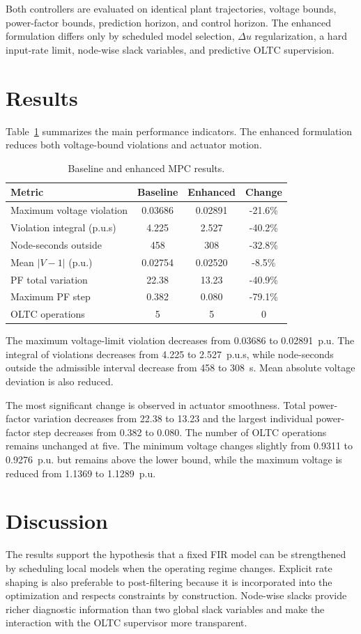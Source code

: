 \documentclass[10pt,twocolumn]{article}
\begin{document}
Both controllers are evaluated on identical plant trajectories, voltage bounds, power-factor bounds, prediction horizon, and control horizon. The enhanced formulation differs only by scheduled model selection, $\Delta u$ regularization, a hard input-rate limit, node-wise slack variables, and predictive OLTC supervision.

\section{Results}
Table~\ref{tab:results} summarizes the main performance indicators. The enhanced formulation reduces both voltage-bound violations and actuator motion.

\begin{table}[h]
\centering
\caption{Baseline and enhanced MPC results.}
\label{tab:results}
\small
\begin{tabular}{|p{2.4cm}|c|c|c|}
\hline
Metric & Baseline & Enhanced & Change\\ \hline
Maximum voltage violation & 0.03686 & 0.02891 & -21.6\%\\
Violation integral (p.u.s) & 4.225 & 2.527 & -40.2\%\\
Node-seconds outside & 458 & 308 & -32.8\%\\
Mean $|V-1|$ (p.u.) & 0.02754 & 0.02520 & -8.5\%\\
PF total variation & 22.38 & 13.23 & -40.9\%\\
Maximum PF step & 0.382 & 0.080 & -79.1\%\\
OLTC operations & 5 & 5 & 0\\ \hline
\end{tabular}
\end{table}

The maximum voltage-limit violation decreases from 0.03686 to 0.02891~p.u. The integral of violations decreases from 4.225 to 2.527~p.u.s, while node-seconds outside the admissible interval decrease from 458 to 308~s. Mean absolute voltage deviation is also reduced.

The most significant change is observed in actuator smoothness. Total power-factor variation decreases from 22.38 to 13.23 and the largest individual power-factor step decreases from 0.382 to 0.080. The number of OLTC operations remains unchanged at five. The minimum voltage changes slightly from 0.9311 to 0.9276~p.u. but remains above the lower bound, while the maximum voltage is reduced from 1.1369 to 1.1289~p.u.

\section{Discussion}
The results support the hypothesis that a fixed FIR model can be strengthened by scheduling local models when the operating regime changes. Explicit rate shaping is also preferable to post-filtering because it is incorporated into the optimization and respects constraints by construction. Node-wise slacks provide richer diagnostic information than two global slack variables and make the interaction with the OLTC supervisor more transparent.
\end{document}
